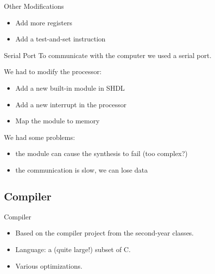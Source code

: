 \documentclass{beamer}
\begin{document}
    \begin{frame}{Other Modifications}
      \begin{itemize}
        \item Add more registers
        \item Add a test-and-set instruction
      \end{itemize}
    \end{frame}

    \begin{frame}{Serial Port}
      To communicate with the computer we used a serial port.

      \pause
      We had to modify the processor:
      \begin{itemize}
        \item Add a new built-in module in SHDL
        \item Add a new interrupt in the processor
        \item Map the module to memory
      \end{itemize}

      \pause
      We had some problems:
      \begin{itemize}
        \item the module can cause the synthesis to fail (too complex?)
        \item the communication is slow, we can lose data
      \end{itemize}
    \end{frame}

    \subsection{Compiler}
    \begin{frame}{Compiler}
      \begin{itemize}
        \item Based on the compiler project from the second-year classes.
        \item Language: a (quite large!) subset of C.
        \item Various optimizations.
      \end{itemize}
    \end{frame}
\end{document}
